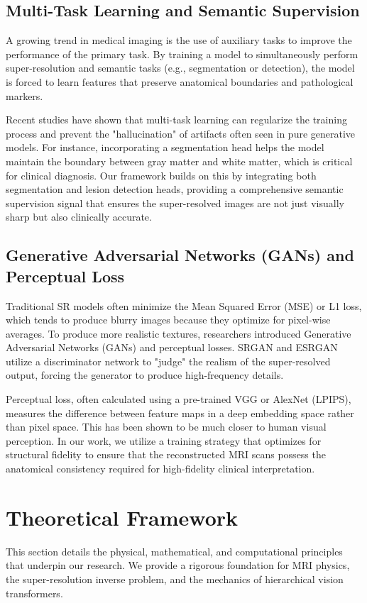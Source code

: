 \documentclass{IEEEoj}
\begin{document}
\subsection{Multi-Task Learning and Semantic Supervision}
A growing trend in medical imaging is the use of auxiliary tasks to improve the performance of the primary task. By training a model to simultaneously perform super-resolution and semantic tasks (e.g., segmentation or detection), the model is forced to learn features that preserve anatomical boundaries and pathological markers.

Recent studies have shown that multi-task learning can regularize the training process and prevent the "hallucination" of artifacts often seen in pure generative models. For instance, incorporating a segmentation head helps the model maintain the boundary between gray matter and white matter, which is critical for clinical diagnosis. Our framework builds on this by integrating both segmentation and lesion detection heads, providing a comprehensive semantic supervision signal that ensures the super-resolved images are not just visually sharp but also clinically accurate.

\subsection{Generative Adversarial Networks (GANs) and Perceptual Loss}
Traditional SR models often minimize the Mean Squared Error (MSE) or L1 loss, which tends to produce blurry images because they optimize for pixel-wise averages. To produce more realistic textures, researchers introduced Generative Adversarial Networks (GANs) and perceptual losses. SRGAN and ESRGAN utilize a discriminator network to "judge" the realism of the super-resolved output, forcing the generator to produce high-frequency details.

Perceptual loss, often calculated using a pre-trained VGG or AlexNet (LPIPS), measures the difference between feature maps in a deep embedding space rather than pixel space. This has been shown to be much closer to human visual perception. In our work, we utilize a training strategy that optimizes for structural fidelity to ensure that the reconstructed MRI scans possess the anatomical consistency required for high-fidelity clinical interpretation.

\section{Theoretical Framework}
This section details the physical, mathematical, and computational principles that underpin our research. We provide a rigorous foundation for MRI physics, the super-resolution inverse problem, and the mechanics of hierarchical vision transformers.
\end{document}
